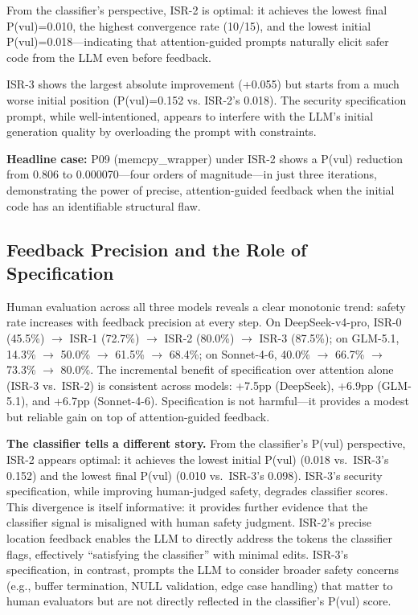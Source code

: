 \documentclass[10pt,conference]{IEEEtran}
\begin{document}
From the classifier's perspective, ISR-2 is optimal: it achieves the lowest final P(vul)=0.010, the highest convergence rate (10/15), and the lowest initial P(vul)=0.018---indicating that attention-guided prompts naturally elicit safer code from the LLM even before feedback.

ISR-3 shows the largest absolute improvement (+0.055) but starts from a much worse initial position (P(vul)=0.152 vs. ISR-2's 0.018). The security specification prompt, while well-intentioned, appears to interfere with the LLM's initial generation quality by overloading the prompt with constraints.

\textbf{Headline case:} P09 (memcpy\_wrapper) under ISR-2 shows a P(vul) reduction from 0.806 to 0.000070---four orders of magnitude---in just three iterations, demonstrating the power of precise, attention-guided feedback when the initial code has an identifiable structural flaw.

\subsection{Feedback Precision and the Role of Specification}

Human evaluation across all three models reveals a clear monotonic trend: safety rate increases with feedback precision at every step. On DeepSeek-v4-pro, ISR-0 (45.5\%) $\rightarrow$ ISR-1 (72.7\%) $\rightarrow$ ISR-2 (80.0\%) $\rightarrow$ ISR-3 (87.5\%); on GLM-5.1, 14.3\% $\rightarrow$ 50.0\% $\rightarrow$ 61.5\% $\rightarrow$ 68.4\%; on Sonnet-4-6, 40.0\% $\rightarrow$ 66.7\% $\rightarrow$ 73.3\% $\rightarrow$ 80.0\%. The incremental benefit of specification over attention alone (ISR-3 vs.\ ISR-2) is consistent across models: +7.5pp (DeepSeek), +6.9pp (GLM-5.1), and +6.7pp (Sonnet-4-6). Specification is not harmful---it provides a modest but reliable gain on top of attention-guided feedback.

\textbf{The classifier tells a different story.} From the classifier's P(vul) perspective, ISR-2 appears optimal: it achieves the lowest initial P(vul) (0.018 vs.\ ISR-3's 0.152) and the lowest final P(vul) (0.010 vs.\ ISR-3's 0.098). ISR-3's security specification, while improving human-judged safety, degrades classifier scores. This divergence is itself informative: it provides further evidence that the classifier signal is misaligned with human safety judgment. ISR-2's precise location feedback enables the LLM to directly address the tokens the classifier flags, effectively ``satisfying the classifier'' with minimal edits. ISR-3's specification, in contrast, prompts the LLM to consider broader safety concerns (e.g., buffer termination, NULL validation, edge case handling) that matter to human evaluators but are not directly reflected in the classifier's P(vul) score.
\end{document}
